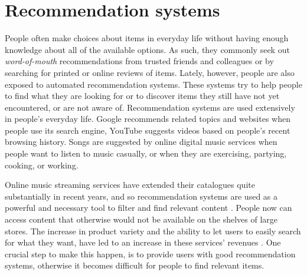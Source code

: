 





\chapter{Recommendation systems}\label{ch4:recommender-systems}
\graphicspath{{./figs/ch5/} }
People often make choices about items in everyday life without having enough knowledge about all of the available options. As such, they commonly seek out \emph{word-of-mouth} recommendations from trusted friends and colleagues or by searching for printed or online reviews of items. Lately, however, people are also exposed to automated recommendation systems. These systems try to help people to find what they are looking for or to discover items they still have not yet encountered, or are not aware of. 
Recommendation systems are used extensively in people's everyday life. Google recommends related topics and websites when people use its search engine, YouTube suggests videos based on people's recent browsing history. Songs are suggested by online digital music services when people want to listen to music casually, or when they are exercising, partying, cooking, or working.

Online music streaming services have extended their catalogues quite substantially in recent years, and so recommendation systems are used as a powerful and necessary tool to filter and find relevant content \autocite{schafer01ecommerce}. People now can access content that otherwise would not be available on the shelves of large stores. The increase in product variety and the ability to let users to easily search for what they want, have led to an increase in these services' revenues \autocite{brynjolfsson03consumer}. 
One crucial step to make this happen, is to provide users with good recommendation systems, otherwise it becomes difficult for people to find relevant items.

